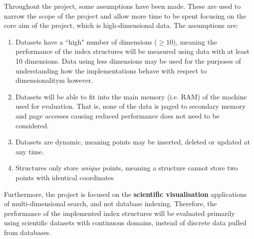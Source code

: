 Throughout the project, some assumptions have been made. These are used to narrow the scope of the project and allow more time to be spent focusing on the core aim of the project, which is high-dimensional data. The assumptions are:
\begin{enumerate}
	\item Datasets have a ``high" number of dimensions ($\geq 10$), meaning the performance of the index structures will be measured using data with at least 10 dimensions. Data using less dimensions may be used for the purposes of understanding how the implementations behave with respect to dimensionalitym however.
	\item Datasets will be able to fit into the main memory (i.e. RAM) of the machine used for evaluation. That is, none of the data is paged to secondary memory and page accesses causing reduced performance does not need to be considered.
	\item Datasets are dynamic, meaning points may be inserted, deleted or updated at any time.
	\item Structures only store \textit{unique} points, meaning a structure cannot store two points with identical coordinates
\end{enumerate}

Furthermore, the project is focused on the \textbf{scientific visualisation} applications of multi-dimensional search, and not database indexing. Therefore, the performance of the implemented index structures will be evaluated primarily using scientific datasets with continuous domains, instead of discrete data pulled from databases.